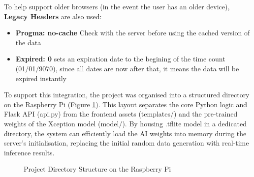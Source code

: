 To help support older browsers (in the event the user has an older device), \textbf{Legacy Headers} are also used:
\begin{itemize}
    \item \textbf{Progma: no-cache} Check with the server before using the cached version of the data
    \item \textbf{Expired: 0} sets an expiration date to the begining of the time count (01/01/9070), since all dates are now after that, it means the
    data will be expired instantly
\end{itemize}

To support this integration, the project was organised into a structured directory on the Raspberry Pi (Figure \ref{fig:Tree_Figure}). This layout separates
the core Python logic and Flask API (api.py) from the frontend assets (templates/) and the pre-trained weights of the Xception model (model/). By housing 
.tflite model in a dedicated directory, the system can efficiently load the AI weights into memory during the server's initialisation, replacing the
initial random data generation with real-time inference results.

\begin{figure}[H]
    \centering
    \begin{minipage}{0.7\textwidth}
    \end{minipage}
    \caption{Project Directory Structure on the Raspberry Pi}
    \label{fig:Tree_Figure}
\end{figure}

